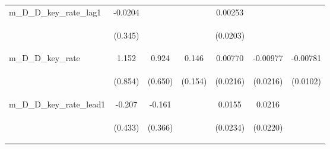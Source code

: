 \documentclass[]{article}
\begin{document}
\begin{center}
\begin{tabular}{lcccccc}
m\_D\_D\_key\_rate\_lag1 & -0.0204 &  &  & 0.00253 &  &  \\
\vspace{4pt} & \begin{footnotesize}(0.345)\end{footnotesize} & \begin{footnotesize}\end{footnotesize} & \begin{footnotesize}\end{footnotesize} & \begin{footnotesize}(0.0203)\end{footnotesize} & \begin{footnotesize}\end{footnotesize} & \begin{footnotesize}\end{footnotesize} \\
m\_D\_D\_key\_rate & 1.152 & 0.924 & 0.146 & 0.00770 & -0.00977 & -0.00781 \\
\vspace{4pt} & \begin{footnotesize}(0.854)\end{footnotesize} & \begin{footnotesize}(0.650)\end{footnotesize} & \begin{footnotesize}(0.154)\end{footnotesize} & \begin{footnotesize}(0.0216)\end{footnotesize} & \begin{footnotesize}(0.0216)\end{footnotesize} & \begin{footnotesize}(0.0102)\end{footnotesize} \\
m\_D\_D\_key\_rate\_lead1 & -0.207 & -0.161 &  & 0.0155 & 0.0216 &  \\
\vspace{4pt} & \begin{footnotesize}(0.433)\end{footnotesize} & \begin{footnotesize}(0.366)\end{footnotesize} & \begin{footnotesize}\end{footnotesize} & \begin{footnotesize}(0.0234)\end{footnotesize} & \begin{footnotesize}(0.0220)\end{footnotesize} & \begin{footnotesize}\end{footnotesize} \\

\end{tabular}
\end{center}
\end{document}
